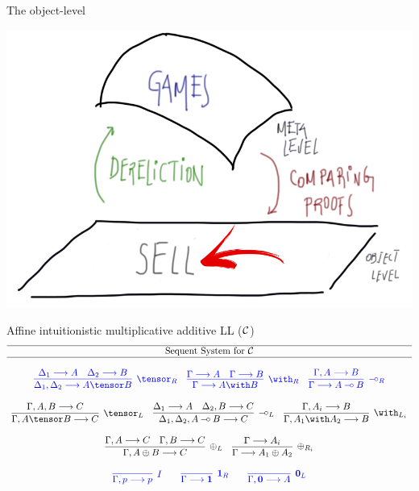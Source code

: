 \documentclass[9pt]{beamer}
\renewcommand{\emph}[1]{{\color{blue} #1}}
\begin{document}
\begin{frame}{The object-level}
\begin{center}
\includegraphics[scale=0.35]{../figs/LF9}
\end{center}
\end{frame}


\begin{frame}{Affine intuitionistic multiplicative additive LL ($\mathcal{C}$)}
\small{$$\begin{array}{c}
\hline\mbox{Sequent System for }\aIMALL\\\hline\\
\emph{\infer[\tensor_R]{\Delta_1, \Delta_2 \lra A \tensor B}
{\Delta_1 \lra A & \Delta_2 \lra B}
\quad 
\infer[\with_R]{\Gamma \lra A \with B}
{\Gamma \lra A & \Gamma \lra B}
\quad \infer[\lolli_R]{\Gamma \lra A \lolli B}{\Gamma, A \lra B}}
\\\\
 \infer[\tensor_L]{\Gamma, A \tensor B \lra C}
{\Gamma, A, B \lra C} 
\quad
\infer[\lolli_L]{\Delta_1, \Delta_2, A \lolli B \lra C}
{\Delta_1 \lra A & \Delta_2, B \lra C}
\quad
 \infer[\with_{L_i}]{\Gamma, A_1 \with A_2 \lra B}
{\Gamma, A_i\lra B} 
\\\\
\infer[\oplus_L]{\Gamma, A \oplus B \lra C}
{\Gamma, A \lra C & \Gamma, B \lra C}
\quad 
\infer[\oplus_{R_i}]{\Gamma \lra A_1 \oplus A_2}{\Gamma \lra A_i}
\\\\
\emph{\infer[I]{\Gamma,p \lra p}{} 
 \qquad
\infer[\one_R]{\Gamma \lra \one}{}
\qquad 
\infer[\zero_L]{ \Gamma,\zero\lra A}{}}
\end{array}
$$}
\end{frame}
\end{document}
